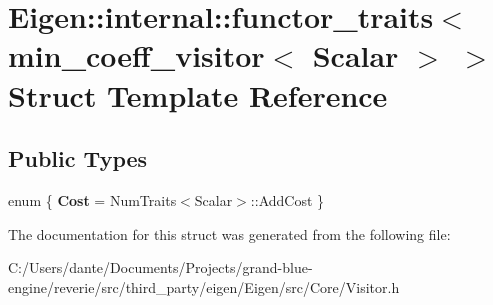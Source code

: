 \hypertarget{struct_eigen_1_1internal_1_1functor__traits_3_01min__coeff__visitor_3_01_scalar_01_4_01_4}{}\section{Eigen\+::internal\+::functor\+\_\+traits$<$ min\+\_\+coeff\+\_\+visitor$<$ Scalar $>$ $>$ Struct Template Reference}
\label{struct_eigen_1_1internal_1_1functor__traits_3_01min__coeff__visitor_3_01_scalar_01_4_01_4}
\subsection*{Public Types}
\begin{DoxyCompactItemize}
\item 
\mbox{\label{struct_eigen_1_1internal_1_1functor__traits_3_01min__coeff__visitor_3_01_scalar_01_4_01_4_ab02cc7a18b31071b504792209c39760a}} 
enum \{ {\bfseries Cost} = Num\+Traits$<$Scalar$>$\+::Add\+Cost
 \}
\end{DoxyCompactItemize}


The documentation for this struct was generated from the following file\+:\begin{DoxyCompactItemize}
\item 
C\+:/\+Users/dante/\+Documents/\+Projects/grand-\/blue-\/engine/reverie/src/third\+\_\+party/eigen/\+Eigen/src/\+Core/Visitor.\+h\end{DoxyCompactItemize}
